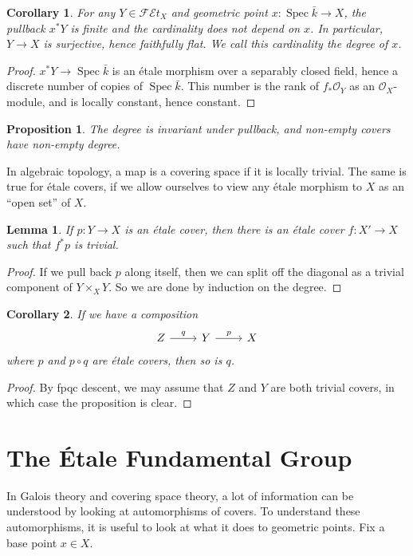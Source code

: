 \documentclass{shortart}
\newtheorem*{prop}{Proposition}
\newtheorem*{lemma}{Lemma}
\newtheorem*{cor}{Corollary}
\theoremstyle{definition}
\newcommand\FEt[1]{\mathscr{FE}t_{#1}}
\DeclareMathOperator\Spec{Spec}
\begin{document}
\begin{cor}
  For any $Y \in \FEt{X}$ and geometric point $x: \Spec \bar{k} \to X$, the pullback $x^*Y$ is finite and the cardinality does not depend on $x$. In particular, $Y \to X$ is surjective, hence faithfully flat. We call this cardinality the \emph{degree} of $x$.
\end{cor}

\begin{proof}
  $x^*Y \to \Spec \bar{k}$ is an \'etale morphism over a separably closed field, hence a discrete number of copies of $\Spec \bar{k}$. This number is the rank of $f_* \mathcal{O}_Y$ as an $\mathcal{O}_X$-module, and is locally constant, hence constant.
\end{proof}

\begin{prop}
  The degree is invariant under pullback, and non-empty covers have non-empty degree.
\end{prop}

In algebraic topology, a map is a covering space if it is locally trivial. The same is true for \'etale covers, if we allow ourselves to view any \'etale morphism to $X$ as an ``open set'' of $X$.

\begin{lemma}
  If $p: Y \to X$ is an \'etale cover, then there is an \'etale cover $f: X' \to X$ such that $f^* p$ is trivial.
\end{lemma}

\begin{proof}
  If we pull back $p$ along itself, then we can split off the diagonal as a trivial component of $Y \times_X Y$. So we are done by induction on the degree.
\end{proof}

\begin{cor}
  If we have a composition
  \[
    \begin{tikzcd}
      Z \ar[r, "q"] & Y \ar[r, "p"] & X
    \end{tikzcd}
  \]
  where $p$ and $p \circ q$ are \'etale covers, then so is $q$.
\end{cor}

\begin{proof}
  By fpqc descent, we may assume that $Z$ and $Y$ are both trivial covers, in which case the proposition is clear.
\end{proof}

\section{The \'Etale Fundamental Group}
In Galois theory and covering space theory, a lot of information can be understood by looking at automorphisms of covers. To understand these automorphisms, it is useful to look at what it does to geometric points. Fix a base point $x \in X$.
\end{document}
